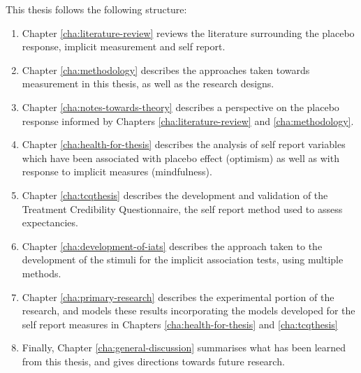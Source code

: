 This thesis follows the following structure:

\begin{enumerate}
\item Chapter \ref{cha:literature-review} reviews the literature surrounding the placebo response, implicit measurement and self report. 
\item Chapter \ref{cha:methodology} describes the approaches taken towards measurement in this thesis, as well as the research designs.
\item Chapter \ref{cha:notes-towards-theory} describes a perspective on the placebo response informed by Chapters \ref{cha:literature-review} and \ref{cha:methodology}.
\item Chapter \ref{cha:health-for-thesis} describes the analysis of self report variables which have been associated with placebo effect (optimism) as well as with response to implicit measures (mindfulness). 
\item Chapter \ref{cha:tcqthesis} describes the development and validation of the Treatment Credibility Questionnaire, the self report method used to assess expectancies.
\item Chapter \ref{cha:development-of-iats} describes the approach taken to the development of the stimuli for the implicit association tests, using multiple methods. 
\item Chapter \ref{cha:primary-research} describes the experimental portion of the research, and models these results incorporating the models developed for the self report measures in Chapters \ref{cha:health-for-thesis} and \ref{cha:tcqthesis}
\item Finally, Chapter \ref{cha:general-discussion} summarises what has been learned from this thesis, and gives directions towards future research.

\end{enumerate}





